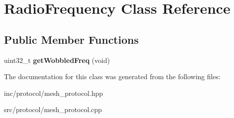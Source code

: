 \hypertarget{classRadioFrequency}{}\section{Radio\+Frequency Class Reference}
\label{classRadioFrequency}
\subsection*{Public Member Functions}
\begin{DoxyCompactItemize}
\item 
\mbox{\label{classRadioFrequency_af98f36e60d90b65ef009767fc1af4d79}} 
uint32\+\_\+t {\bfseries get\+Wobbled\+Freq} (void)
\end{DoxyCompactItemize}


The documentation for this class was generated from the following files\+:\begin{DoxyCompactItemize}
\item 
inc/protocol/mesh\+\_\+protocol.\+hpp\item 
src/protocol/mesh\+\_\+protocol.\+cpp\end{DoxyCompactItemize}
